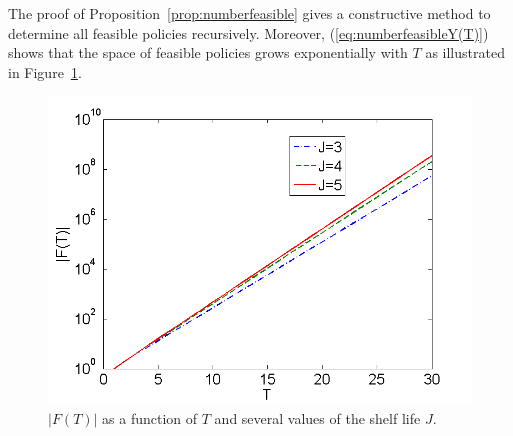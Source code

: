 The proof of Proposition~\ref{prop:numberfeasible} gives a constructive method to determine all feasible policies recursively. Moreover, (\ref{eq:numberfeasibleY(T)}) shows that the space of feasible policies grows exponentially with $T$ as illustrated in Figure~\ref{fig:numberfeasible}.

\begin{figure}[!bt]
\centering
\includegraphics[scale=0.3]{iccsa2015/figures/numberfeasiblelogy.png} %
\caption{ $|F(T)|$ as a function of $T$ and several values of the shelf life $J$.}
\label{fig:numberfeasible}
\end{figure}


